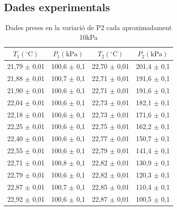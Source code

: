 \documentclass[12pt,twosides,onecolumn,openany]{article}
\begin{document}
\subsection{Dades experimentals}
\renewcommand{\arraystretch}{1.65}
\begin{table}[h]
    \centering
    \caption{Dades preses en la variació de P2 cada aproximadament 10kPa}
    \label{tab:presstemp}
    \begin{tabular}{c|c|c|c}
        $T_1(^\circ \text{C})$ & $P_1(\text{kPa})$ & $T_2(^\circ \text{C})$ & $P_2(\text{kPa})$ \\
        \hline\hline
        21,79 $\pm$ 0,01 & 100,6 $\pm$ 0,1 & 22,70 $\pm$ 0,01 & 201,4 $\pm$ 0,1 \\
        21,88 $\pm$ 0,01 & 100,7 $\pm$ 0,1 & 22,71 $\pm$ 0,01 & 191,6 $\pm$ 0,1 \\
        21,90 $\pm$ 0,01 & 100,6 $\pm$ 0,1 & 22,71 $\pm$ 0,01 & 191,6 $\pm$ 0,1 \\
        22,04 $\pm$ 0,01 & 100,6 $\pm$ 0,1 & 22,73 $\pm$ 0,01 & 182,1 $\pm$ 0,1 \\
        22,18 $\pm$ 0,01 & 100,6 $\pm$ 0,1 & 22,73 $\pm$ 0,01 & 171,6 $\pm$ 0,1 \\
        22,25 $\pm$ 0,01 & 100,6 $\pm$ 0,1 & 22,75 $\pm$ 0,01 & 162,2 $\pm$ 0,1 \\
        22,40 $\pm$ 0,01 & 100,6 $\pm$ 0,1 & 22,77 $\pm$ 0,01 & 150,7 $\pm$ 0,1 \\
        22,55 $\pm$ 0,01 & 100,6 $\pm$ 0,1 & 22,79 $\pm$ 0,01 & 141,4 $\pm$ 0,1 \\
        22,71 $\pm$ 0,01 & 100,8 $\pm$ 0,1 & 22,82 $\pm$ 0,01 & 130,9 $\pm$ 0,1 \\
        22,79 $\pm$ 0,01 & 100,6 $\pm$ 0,1 & 22,82 $\pm$ 0,01 & 120,3 $\pm$ 0,1 \\
        22,87 $\pm$ 0,01 & 100,7 $\pm$ 0,1 & 22,85 $\pm$ 0,01 & 110,4 $\pm$ 0,1 \\
        22,92 $\pm$ 0,01 & 100,6 $\pm$ 0,1 & 22,87 $\pm$ 0,01 & 100,5 $\pm$ 0,1 \\
    \end{tabular}
\end{table}
\end{document}
